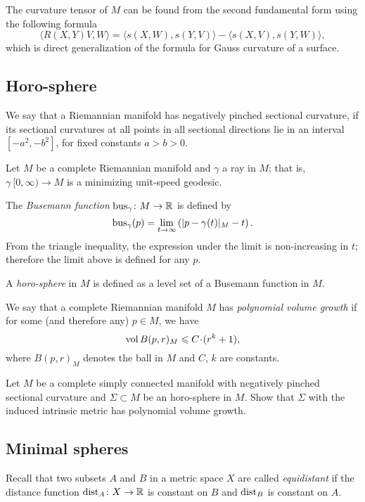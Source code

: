 The curvature tensor of $M$ can be found from the second fundamental form using the following  formula
\[\langle R(X,Y)V,W\rangle=\langle s(X,W),s(Y,V)\rangle-\langle s(X,V),s(Y,W)\rangle,\]
which is direct generalization of the formula for Gauss curvature of a surface.


\subsection*{Horo-sphere}
\label{Horosphere}

We say that a Riemannian manifold has negatively pinched sectional curvature, if its sectional curvatures at all points in all sectional directions lie in an interval $[-a^2, -b^2]$, for fixed constants $a>b>0$.

Let $M$ be a complete Riemannian manifold
and $\gamma$ a ray in $M$; 
that is, $\gamma\:[0, \infty)\to M$ is a minimizing unit-speed geodesic.

The \label{page:Busemann function}\emph{Busemann function} $\operatorname{\rm bus}\nolimits_\gamma\colon M\to\mathbb{R}$ is defined by
$$\operatorname{\rm bus}\nolimits_\gamma(p)=\lim_{t\to\infty}\left(|p-\gamma(t)|_M-t\right).$$
From the triangle inequality, 
the expression under the limit is non-increasing in $t$; 
therefore  the limit above is defined for any $p$.

A \emph{horo-sphere} in $M$ is defined as a level set of a Busemann function
in $M$.

We say that a complete Riemannian manifold $M$ has \emph{polynomial volume growth} if for some (and therefore any) $p\in M$, 
we have 
$$\vol B(p,r)_M\z\le C\cdot (r^k+1),$$ 
where $B(p,r)_M$ denotes the ball in $M$ and  $C$, $k$ are constants.

\begin{pr} Let $M$ be a complete simply connected manifold with negatively pinched sectional curvature
and $\Sigma\subset M$ be an horo-sphere in $M$.
Show that
$\Sigma$ with the induced intrinsic metric 
has polynomial volume growth.
\end{pr}

\subsection*{Minimal spheres}
\label{Minimal spheres}

Recall that two subsets $A$ and $B$ in a metric space $X$ are called \emph{equidistant} if the distance function $\operatorname{\rm dist}\nolimits_A\colon X\to\mathbb{R}$ is constant on $B$ and $\operatorname{\rm dist}\nolimits_B$ is constant on $A$.

